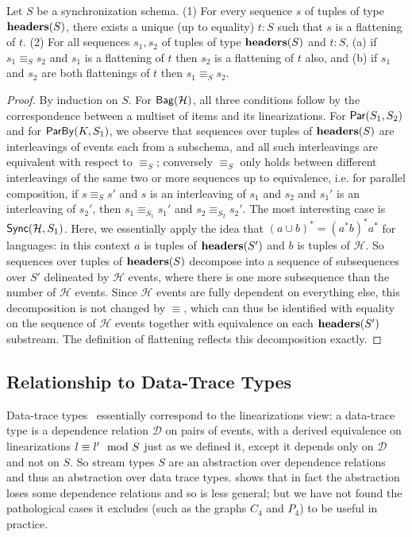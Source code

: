 \begin{proposition}
\label{45:prop:sps-sequence-correspondence}
Let $S$ be a synchronization schema.
(1) For every sequence $s$ of tuples of type $\mathbf{headers}(S)$, there exists a unique (up to equality) $t : S$ such that $s$ is a flattening of $t$.
(2) For all sequences $s_1, s_2$ of tuples of type $\mathbf{headers}(S)$ and $t : S$,
(a) if $s_1 \equiv_{S} s_2$ and $s_1$ is a flattening of  $t$ then $s_2$ is a flattening of $t$ also, and
(b) if $s_1$ and $s_2$ are both flattenings of $t$ then $s_1 \equiv_{S} s_2$.
\end{proposition}
\begin{proof}
By induction on $S$.
For $\mathsf{Bag}({\mathcal{H}})$,
all three conditions follow by the correspondence between a multiset of items and its linearizations.
For $\mathsf{Par}({S_1}, {S_2})$
and for $\mathsf{ParBy}({K}, S_1)$,
we observe that sequences over tuples of $\mathbf{headers}(S)$ are interleavings of events each from a subschema,
and all such interleavings are equivalent with respect to $\equiv_{S}$;
conversely $\equiv_{S}$ only holds between different interleavings of the same two or more sequences up to equivalence, i.e. for parallel composition, if $s \equiv_{S} s'$ and $s$ is an interleaving of $s_1$ and $s_2$ and $s_1'$ is an interleaving of $s_2'$, then $s_1 \equiv_{S_1} s_1'$ and $s_2 \equiv_{S_2} s_2'$.
The most interesting case is $\mathsf{Sync}({\mathcal{H}}, S_1)$.
Here, we essentially apply the idea that $(a \cup b)^{*} = (a^{*} b)^{*} a^{*}$ for languages: in this context $a$ is tuples of $\mathbf{headers}(S')$ and $b$ is tuples of $\mathcal{H}$.
So sequences over  tuples of $\mathbf{headers}(S)$ decompose into a sequence of subsequences over $S'$ delineated by $\mathcal{H}$ events, where there is one more subsequence than the number of $\mathcal{H}$ events.
Since $\mathcal{H}$ events are fully dependent on everything else, this decomposition is not changed by $\equiv$, which can thus be identified with equality on the sequence of $\mathcal{H}$ events together with equivalence on each $\mathbf{headers}(S')$ substream.
The definition of flattening reflects this decomposition exactly.
\end{proof}

\subsection{Relationship to Data-Trace Types}

Data-trace types~ essentially correspond to
the linearizations view: a data-trace type is a dependence relation
$\mathcal{D}$ on pairs of events,
with a derived equivalence on linearizations $l \equiv l' \mod {S}$
just as we defined it, except it depends only on $\mathcal{D}$ and not on
$S$.
So stream types $S$ are an abstraction over dependence relations and thus an abstraction over data trace types.
 shows that in fact the abstraction loses some dependence relations and so is less general; but we have not found the pathological cases it excludes (such as the graphs $C_4$ and $P_4$) to be useful in practice.

